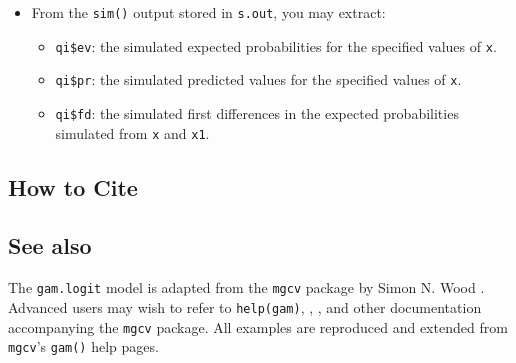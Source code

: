\begin{itemize}
\item From the {\tt sim()} output stored in {\tt s.out}, you may extract:
\begin{itemize}
\item {\tt qi\$ev}: the simulated expected probabilities for the specified values of {\tt x}.
\item {\tt qi\$pr}: the simulated predicted values for the specified values of {\tt x}.
\item {\tt qi\$fd}: the simulated first differences in the expected probabilities simulated from {\tt x} and {\tt x1}.
\end{itemize}
\end{itemize}

\subsection* {How to Cite} 




\subsection* {See also}
The {\tt gam.logit} model is adapted from the  {\tt mgcv} package by Simon N. Wood \citep{Wood06}. Advanced users may wish to refer to {\tt help(gam)},  \cite{Wood04}, \cite{Wood00}, and other documentation accompanying the {\tt mgcv} package. All examples are reproduced and extended from {\tt mgcv}'s {\tt gam()} help pages.
